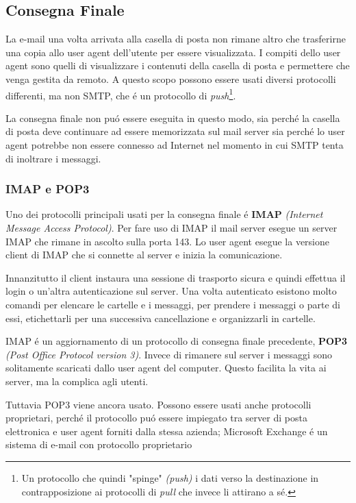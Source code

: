 \documentclass[12pt]{article}
\begin{document}
\subsection{Consegna Finale}\label{posta-elettronica-consegna-finale}
La e-mail una volta arrivata alla casella di posta non rimane altro che trasferirne una copia allo user agent dell'utente per essere 
visualizzata. I compiti dello user agent sono quelli di visualizzare i contenuti della casella di posta e permettere che venga 
gestita da remoto. A questo scopo possono essere usati diversi protocolli differenti, ma non SMTP, che \'e un protocollo di 
\textit{push}\footnote{Un protocollo che quindi "spinge" \textit{(push)} i dati verso la destinazione in contrapposizione ai 
protocolli di \textit{pull} che invece li attirano a s\'e.}.

La consegna finale non pu\'o essere eseguita in questo modo, sia perch\'e la casella di posta deve continuare ad essere memorizzata 
sul mail server sia perch\'e lo user agent potrebbe non essere connesso ad Internet nel momento in cui SMTP tenta di inoltrare i 
messaggi.

\subsubsection{IMAP e POP3}\label{posta-elettronica-imap-pop3}
Uno dei protocolli principali usati per la consegna finale \'e \textbf{IMAP} \textit{(Internet Message Access Protocol)}. Per fare 
uso di IMAP il mail server esegue un server IMAP che rimane in ascolto sulla porta 143. Lo user agent esegue la versione client di IMAP che si connette al server e inizia la comunicazione.

Innanzitutto il client instaura una sessione di trasporto sicura e quindi effettua il login o un'altra autenticazione sul server. Una 
volta autenticato esistono molto comandi per elencare le cartelle e i messaggi, per prendere i messaggi o parte di essi, etichettarli 
per una successiva cancellazione e organizzarli in cartelle.

IMAP \'e un aggiornamento di un protocollo di consegna finale precedente, \textbf{POP3} \textit{(Post Office Protocol version 3)}. 
Invece di rimanere sul server i messaggi sono solitamente scaricati dallo user agent del computer. Questo facilita la vita ai server, 
ma la complica agli utenti.

Tuttavia POP3 viene ancora usato. Possono essere usati anche protocolli proprietari, perch\'e il protocollo pu\'o essere impiegato 
tra server di posta elettronica e user agent forniti dalla stessa azienda; Microsoft Exchange \'e un sistema di e-mail con protocollo 
proprietario
\end{document}

